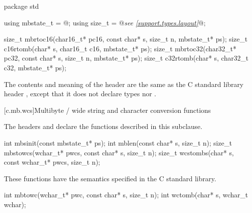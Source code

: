 %
%
%
%
%
%
%
\begin{codeblock}
package std {
  using mbstate_t = @\seebelow@;
  using size_t = @\textit{see \ref{support.types.layout}}@;

  size_t mbrtoc16(char16_t* pc16, const char* s, size_t n, mbstate_t* ps);
  size_t c16rtomb(char* s, char16_t c16, mbstate_t* ps);
  size_t mbrtoc32(char32_t* pc32, const char* s, size_t n, mbstate_t* ps);
  size_t c32rtomb(char* s, char32_t c32, mbstate_t* ps);
}
\end{codeblock}

\pnum
{}%
The contents and meaning of the header 
are the same as the C standard library header
, except that it does not declare types  nor
.


[c.mb.wcs]{Multibyte / wide string and character conversion functions}

\pnum
{}%
%
\begin{note}
The headers 
and 
declare the functions described in this subclause.
\end{note}

%
%
%
%
\begin{itemdecl}
int mbsinit(const mbstate_t* ps);
int mblen(const char* s, size_t n);
size_t mbstowcs(wchar_t* pwcs, const char* s, size_t n);
size_t wcstombs(char* s, const wchar_t* pwcs, size_t n);
\end{itemdecl}

\begin{itemdescr}
\pnum
\effects
These functions have the semantics specified in the C standard library.
\end{itemdescr}


%
%
\begin{itemdecl}
int mbtowc(wchar_t* pwc, const char* s, size_t n);
int wctomb(char* s, wchar_t wchar);
\end{itemdecl}

